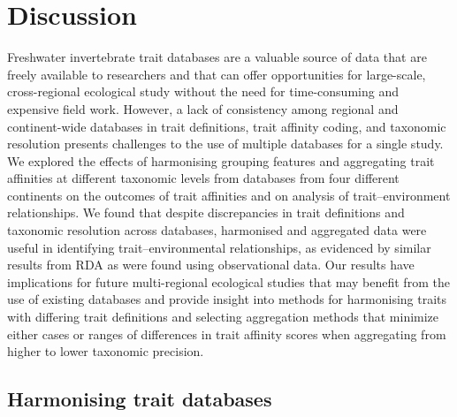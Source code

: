 \documentclass{article}
\begin{document}
\newpage


\section*{Discussion}


Freshwater invertebrate trait databases are a valuable source of data that are freely available to researchers and that can offer opportunities for large-scale, cross-regional ecological study without the need for time-consuming and expensive field work. However, a lack of consistency among regional and continent-wide databases in trait definitions, trait affinity coding, and taxonomic resolution presents challenges to the use of multiple databases for a single study. We explored the effects of harmonising grouping features and aggregating trait affinities at different taxonomic levels from databases from four different continents on the outcomes of trait affinities and on analysis of trait–environment relationships. We found that despite discrepancies in trait definitions and taxonomic resolution across databases, harmonised and aggregated data were useful in identifying trait–environmental relationships, as evidenced by similar results from RDA as were found using observational data. Our results have implications for future multi-regional ecological studies that may benefit from the use of existing databases and provide insight into methods for harmonising traits with differing trait definitions and selecting aggregation methods that minimize either cases or ranges of differences in trait affinity scores when aggregating from higher to lower taxonomic precision.

\subsection*{Harmonising trait databases}
\end{document}
